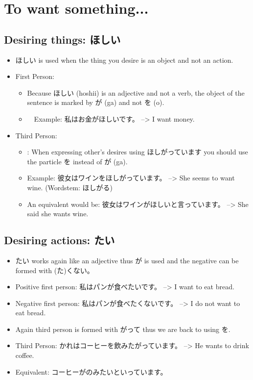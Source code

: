 \documentclass{article}
\begin{document}
\section{To want something...}
\subsection{Desiring things: ほしい}
\begin{itemize}
\item ほしい is used when the thing you desire is an object and not an action.
\item First Person:
\begin{itemize}
\item Because ほしい (hoshii) is an adjective and not a verb, the object of the sentence is marked by が (ga) and not を (o).
\item　Example: 私はお金がほしいです。 --> I want money.
\end{itemize}
\item Third Person:
\begin{itemize}
\item: When expressing other’s desires using ほしがっています you should use the particle を instead of が (ga).
\item Example: 彼女はワインをほしがっています。	 --> She seems to want wine.	(Wordstem: ほしがる)
\item An equivalent would be: 彼女はワインがほしいと言っています。 --> She said she wants wine.
\end{itemize}
\end{itemize}
\subsection{Desiring actions: たい}
\begin{itemize}
\item たい works again like an adjective thus が is used and the negative can be formed with (た)くない。
\item Positive first person: 私はパンが食べたいです。 --> I want to eat bread.
\item Negative first person: 私はパンが食べたくないです。 --> I do not want to eat bread. \\
\item Again third person is formed with がって thus we are back to using を.
\item Third Person: かれはコーヒーを飲みたがっています。 --> He wants to drink coffee.
\item Equivalent: コーヒーがのみたいといっています。
\end{itemize}
\end{document}
